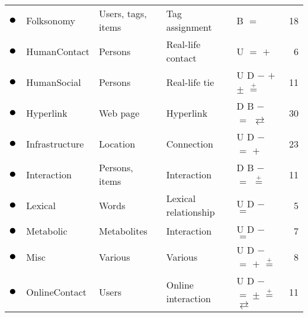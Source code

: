 \begin{tabular}{lllllr}
\textcolor{colorFolksonomy}{$\newmoon$} &Folksonomy & Users, tags, items & Tag assignment & \phantom{U} \phantom{D} B \phantom{$-$} $=$ \phantom{$+$} \phantom{$\pm$} \phantom{$\stackrel{+}{=}$} \phantom{$*$} \phantom{$_*{}^*$} \phantom{$\rightleftarrows$} \phantom{$++$}  &  18\\
\textcolor{colorHumanContact}{$\newmoon$} &HumanContact & Persons & Real-life contact & U \phantom{D} \phantom{B} \phantom{$-$} $=$ $+$ \phantom{$\pm$} \phantom{$\stackrel{+}{=}$} \phantom{$*$} \phantom{$_*{}^*$} \phantom{$\rightleftarrows$} \phantom{$++$}  &  6\\
\textcolor{colorHumanSocial}{$\newmoon$} &HumanSocial & Persons & Real-life tie & U D \phantom{B} $-$ \phantom{$=$} $+$ $\pm$ $\stackrel{+}{=}$ \phantom{$*$} \phantom{$_*{}^*$} \phantom{$\rightleftarrows$} \phantom{$++$}  &  11\\
\textcolor{colorHyperlink}{$\newmoon$} &Hyperlink & Web page & Hyperlink & \phantom{U} D B $-$ $=$ \phantom{$+$} \phantom{$\pm$} \phantom{$\stackrel{+}{=}$} \phantom{$*$} \phantom{$_*{}^*$} $\rightleftarrows$ \phantom{$++$}  &  30\\
\textcolor{colorInfrastructure}{$\newmoon$} &Infrastructure & Location & Connection & U D \phantom{B} $-$ $=$ $+$ \phantom{$\pm$} \phantom{$\stackrel{+}{=}$} \phantom{$*$} \phantom{$_*{}^*$} \phantom{$\rightleftarrows$} \phantom{$++$}  &  23\\
\textcolor{colorInteraction}{$\newmoon$} &Interaction & Persons, items & Interaction & \phantom{U} D B $-$ $=$ \phantom{$+$} \phantom{$\pm$} $\stackrel{+}{=}$ \phantom{$*$} \phantom{$_*{}^*$} \phantom{$\rightleftarrows$} \phantom{$++$}  &  11\\
\textcolor{colorLexical}{$\newmoon$} &Lexical & Words & Lexical relationship & U D \phantom{B} $-$ $=$ \phantom{$+$} \phantom{$\pm$} \phantom{$\stackrel{+}{=}$} \phantom{$*$} \phantom{$_*{}^*$} \phantom{$\rightleftarrows$} \phantom{$++$}  &  5\\
\textcolor{colorMetabolic}{$\newmoon$} &Metabolic & Metabolites & Interaction & U D \phantom{B} $-$ $=$ \phantom{$+$} \phantom{$\pm$} \phantom{$\stackrel{+}{=}$} \phantom{$*$} \phantom{$_*{}^*$} \phantom{$\rightleftarrows$} \phantom{$++$}  &  7\\
\textcolor{colorMisc}{$\newmoon$} &Misc & Various & Various & U D \phantom{B} $-$ $=$ $+$ \phantom{$\pm$} $\stackrel{+}{=}$ \phantom{$*$} \phantom{$_*{}^*$} \phantom{$\rightleftarrows$} \phantom{$++$}  &  8\\
\textcolor{colorOnlineContact}{$\newmoon$} &OnlineContact & Users & Online interaction & U D \phantom{B} $-$ $=$ \phantom{$+$} $\pm$ $\stackrel{+}{=}$ \phantom{$*$} \phantom{$_*{}^*$} $\rightleftarrows$ \phantom{$++$}  &  11\\

\end{tabular}
